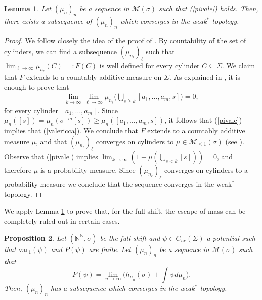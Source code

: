 \documentclass[letterpaper,11pt]{amsart}
\theoremstyle{plain}
\theoremstyle{plain}
\newtheorem{proposition}{Proposition}[subsection]
\newtheorem{lemma}[proposition]{Lemma}
\theoremstyle{definition}
\theoremstyle{remark}
\def\N{{\mathbb N}}
\def\M{{\mathcal M}}
\begin{document}
\begin{lemma}\label{lem:nicev} Let $(\mu_n)_n$ be a sequence in $\M(\sigma)$ such that (\ref{pivale}) holds. Then, there exists a subsequence of $(\mu_n)_n$ which converges in the weak$^*$ topology.
\end{lemma}
\begin{proof} We follow closely the idea of the proof of \cite[Proposition 4.11]{iv}. By countability of the set of cylinders, we can find a subsequence $(\mu_{n_\ell})_\ell$ such that $\lim_{\ell\to\infty}\mu_{n_\ell}(C)=:F(C)$ is well defined for every cylinder $C\subseteq \Sigma$. We  claim that $F$ extends to a countably additive measure on $\Sigma$. As explained in \cite[Proposition 4.11]{iv}, it is enough to prove that 
\begin{align}\label{valericca}\lim_{k\to\infty}\lim_{\ell\to\infty}\mu_{n_\ell}\big(\bigcup_{s\ge k}[a_1,\ldots, a_m,s]\big)=0,\end{align}
for every cylinder $[a_1,\ldots, a_m]$. Since $\mu_n([s])=\mu_n(\sigma^{-m}[s])\ge \mu_n([a_1,\ldots, a_m,s])$, it follows that (\ref{pivale}) implies that (\ref{valericca}). We conclude that $F$ extends to a countably additive measure $\mu$, and that $(\mu_{n_\ell})_\ell$ converges on cylinders to $\mu\in \M_{\le1}(\sigma)$ (see \cite[Proposition 4.11 and Lemma 4.1]{iv}). Observe that (\ref{pivale}) implies $\lim_{k\to\infty}(1-\mu(\bigcup_{s<k} [s]))=0$, and therefore $\mu$ is a probability measure. Since $(\mu_{n_\ell})_\ell$ converges on cylinders to a probability measure we conclude that the sequence converges in the weak$^*$ topology. \end{proof}

We apply Lemma \ref{lem:nicev} to prove that, for the full shift, the escape of mass can be completely ruled out in certain cases.  

\begin{proposition}\label{lem:finalfull} Let $(\N^\N, \sigma)$ be the full shift and $\psi\in C_{uc}(\Sigma)$ a potential such that $\text{var}_1(\psi)$ and $P(\psi)$ are finite. Let $(\mu_n)_n$ be a sequence in $\M(\sigma)$ such that $$P(\psi)=\lim_{n\to\infty}\big(h_{\mu_n}(\sigma)+\int \psi d\mu_n\big).$$ Then, $(\mu_n)_n$ has a subsequence which converges in the weak$^*$ topology. 
\end{proposition}
\end{document}

